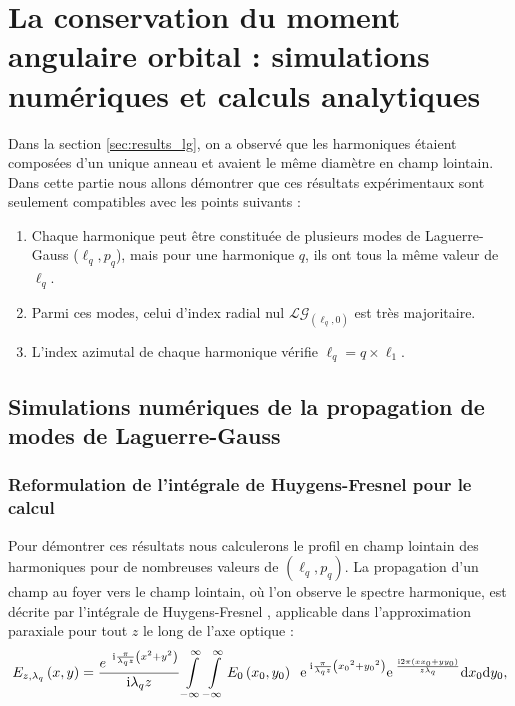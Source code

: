 \section{La conservation du moment angulaire orbital : simulations numériques et calculs analytiques}
\label{sec:oam_cons}
Dans la section \ref{sec:results_lg}, on a observé que les harmoniques étaient composées d'un unique anneau et avaient le même diamètre en champ lointain. Dans cette partie nous allons démontrer que ces résultats expérimentaux sont seulement compatibles avec les points suivants :
\begin{enumerate}
\item Chaque harmonique peut être constituée de plusieurs modes de Laguerre-Gauss ($\ell_q,p_q$), mais pour une harmonique $q$, ils ont tous la même valeur de $\ell_q$.
\item Parmi ces modes, celui d'index radial nul $\mathcal{LG}_{(\ell_q,0)}$ est très majoritaire.
\item L'index azimutal de chaque harmonique vérifie $\ell_q=q\times\ell_1$.
\label{enum:properties}
\end{enumerate}

\subsection{Simulations numériques de la propagation de modes de Laguerre-Gauss}
\subsubsection{Reformulation de l'intégrale de Huygens-Fresnel pour le calcul}
Pour démontrer ces résultats nous calculerons le profil en champ lointain des harmoniques pour de nombreuses valeurs de $(\ell_q,p_q)$. La propagation d'un champ au foyer vers le champ lointain, où l'on observe le spectre harmonique, est décrite par l'intégrale de Huygens-Fresnel , applicable dans l'approximation paraxiale pour tout $z$ le long de l'axe optique :
	\begin{equation*}
	{E_{z,{\lambda _q}}}\left( {x,y} \right) = \frac{{{e^{\;\;\mathrm{i}\frac{{\pi }}{{{\lambda _q}z}}\left( {{x^2} + {y^2}} \right)}}}}{{\mathrm{i}{\lambda _q}z}}\int \limits_{ - \infty }^\infty \int \limits_{ - \infty }^\infty  {E_0}\left( {{x_0},{y_0}} \right)\;\;{{\mathrm{e}}^{\;\mathrm{i}\frac{\pi }{{{\lambda _q}z}}\left( {{x_0}^2 + {y_0}^2} \right)}}{{\mathrm{e}}^{\;\frac{{ \mathrm{i} 2{\pi}\left( {x{x_0} + y{y_0}} \right)}}{{z{\lambda _q}}}}}{\mathrm{d}}{x_0}{\mathrm{d}}{y_0},
	\end{equation*}

